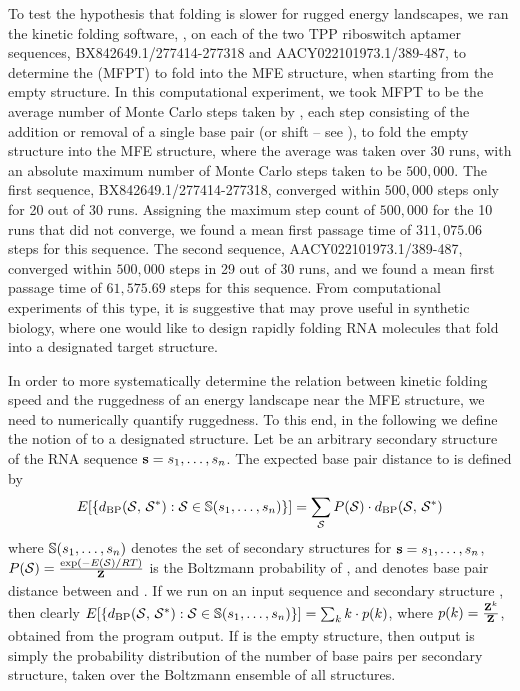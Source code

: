 To test the hypothesis that folding is slower for rugged energy landscapes,
we ran the kinetic folding software, \kinfold \cite{flamm},
on each of the two TPP riboswitch aptamer sequences,
BX842649.1/277414-277318 and AACY022101973.1/389-487,
to determine the \mfpt (MFPT) to
fold into the MFE structure, when starting from the empty structure.
In this computational
experiment, we took MFPT to be the average number of Monte Carlo steps
taken by \kinfold, each step consisting of the addition or removal
of a single base pair (or shift -- see \cite{flamm}), to fold the
empty structure into the MFE
structure, where the average was taken over $30$ runs, with an absolute
maximum number of Monte Carlo steps taken to be $500,000$.
The first sequence, BX842649.1/277414-277318, converged within $500,000$
steps only for 20 out of 30 runs. Assigning the maximum step count of
$500,000$ for the 10 runs that did not converge, we found a mean first
passage time of $311,075.06$ steps for this sequence.
The second sequence, AACY022101973.1/389-487, converged within $500,000$
steps in 29 out of 30 runs, and we found a mean first passage time of
$61,575.69$ steps for this sequence. From computational experiments of this
type, it is suggestive that \fftbor may prove useful in synthetic
biology,
where one would like to design rapidly folding RNA molecules that
fold into a designated target structure.

In order to more systematically determine the relation between kinetic
folding speed and the ruggedness of an energy landscape near the MFE structure,
we need to numerically quantify ruggedness. To this end, in the following
we define the notion of \ebpd to a designated
structure. Let \strSt be an arbitrary secondary structure of the RNA sequence
${\bf s} = s_1,\dots,s_n$.
The expected base pair distance to \strSt is defined by
\begin{align}
E[ \{ d_{\text{BP}}(\mathcal S,\,\mathcal S^*) : \mathcal S \in \mathbb{S}(s_1,\dots,s_n)\} ] =
\sum_{\mathcal S} P(\mathcal S) \cdot d_{\text{BP}}(\mathcal S,\,\mathcal S^*)
\end{align}
where
$\mathbb{S}(s_1,\dots,s_n)$ denotes the set of secondary structures for
${\bf s} = s_1,\dots,s_n$, $P(\mathcal S) = \frac{\exp(-E(\mathcal S)/RT)}{{\bf Z}^{}_{}}$ is the Boltzmann
probability of \str, and
\dBP{\str}{\strSt} denotes base pair distance between \str and \strSt.
If we run \fftbor on an input sequence \seq and secondary structure
\strSt, then clearly
$E[ \{ d_{\text{BP}}(\mathcal S,\,\mathcal S^*) : \mathcal S \in \mathbb{S}(s_1,\dots,s_n)\} ] =
\sum_{k} k \cdot p(k)$, where $p(k)=\frac{{\bf Z}^{k}_{}}{{\bf Z}^{}_{}}$, obtained from the
program output.  If \strSt is the empty structure, then \fftbor output
is simply the probability distribution of the number of base pairs per
secondary structure, taken over the Boltzmann ensemble of all structures.

